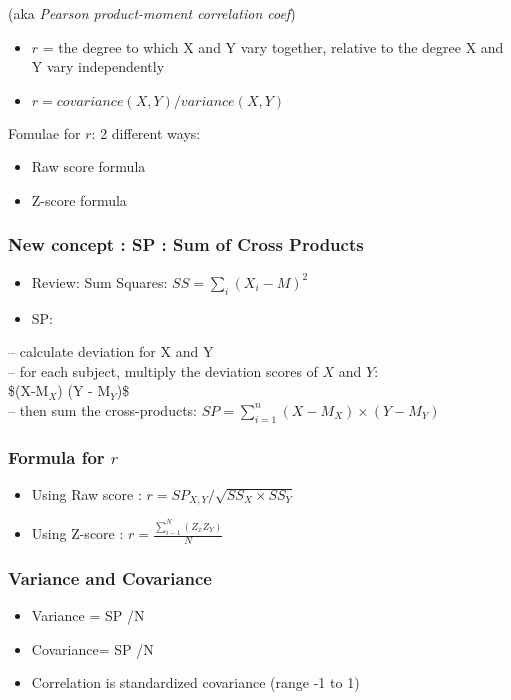 \documentclass[11pt]{article}
\begin{document}
  (aka \emph{Pearson product-moment correlation coef})
\begin{itemize}
\item $r$ = the degree to which X and Y vary together, relative to the degree X and Y vary independently
\item $r = covariance(X,Y) / variance(X,Y)$
\end{itemize}
  Fomulae for $r$: 2 different ways:
\begin{itemize}
\item Raw score formula
\item Z-score formula
\end{itemize}
\subsubsection{New concept : SP : Sum of Cross Products}
\label{sec-2-2-2}

\begin{itemize}
\item Review: Sum Squares: $SS = \sum_i ( X_i - M)^2$
\item SP:
\end{itemize}
    -- calculate deviation for X and Y \\
    -- for each subject, multiply the deviation scores of $X$ and $Y$:\\
       \$(X-M$_X$) \texttimes{} (Y - M$_Y$)\$\\
    -- then sum the cross-products: 
       $SP=\sum_{i=1}^n (X-M_X) \times (Y - M_Y)$
\subsubsection{Formula for $r$}
\label{sec-2-2-3}

\begin{itemize}
\item Using Raw score :  $r = SP_{X,Y} / \sqrt{SS_X \times SS_Y}$
\item Using Z-score : $r = \frac{\sum_{i-1}^N ({Z_x Z_Y})}{N}$
\end{itemize}
\subsubsection{Variance and Covariance}
\label{sec-2-2-4}

\begin{itemize}
\item Variance = SP /N
\item Covariance= SP /N
\item Correlation is standardized covariance (range -1 to 1)
\end{itemize}
\end{document}

